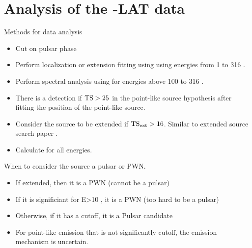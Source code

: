 \section{Analysis of the \fermi-LAT data}


Methods for data analysis
\begin{itemize}
\item Cut on pulsar phase
\item Perform localization or extension fitting using \gtlike using energies from 1 \gev to 316 \gev.
\item Perform spectral analysis using \gtlike for energies above 100 \mev to 316 \gev.
\item There is a detection if  $\text{TS}>25$ in the point-like source hypothesis after fitting the position of the point-like source. 
\item Consider the source to be extended if $\text{TS}_\text{ext}>16$. Similar to extended source search paper .
\item Calculate \tscut for all energies.
\end{itemize}

When to consider the source a pulsar or PWN.
\begin{itemize}
  \item If extended, then it is a PWN (cannot be a pulsar)
  \item If it is significiant for E>10 \gev, it is a PWN (too hard to be a pulsar)
  \item Otherwise, if it has a cutoff, it is a Pulsar candidate
  \item For point-like emission that is not significantly cutoff, the emission  mechanism is uncertain.
\end{itemize}

